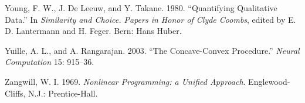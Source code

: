 \documentclass[
  12pt,
  letterpaper,
  DIV=11,
  numbers=noendperiod]{scrartcl}
\newlength{\cslhangindent}
\newenvironment{CSLReferences}[2] %
 {\begin{list}{}{%
  \setlength{\itemindent}{0pt}
  \setlength{\leftmargin}{0pt}
  \setlength{\parsep}{0pt}
  \ifodd #1
   \setlength{\leftmargin}{\cslhangindent}
   \setlength{\itemindent}{-1\cslhangindent}
  \fi
  \setlength{\itemsep}{#2\baselineskip}}}
 {\end{list}}
\begin{document}
\begin{CSLReferences}{1}{0}
Young, F. W., J. De Leeuw, and Y. Takane. 1980. {``Quantifying
Qualitative Data.''} In \emph{Similarity and Choice. Papers in Honor of
Clyde Coombs}, edited by E. D. Lantermann and H. Feger. Bern: Hans
Huber.

Yuille, A. L., and A. Rangarajan. 2003. {``{The Concave-Convex
Procedure}.''} \emph{Neural Computation} 15: 915--36.

Zangwill, W. I. 1969. \emph{{Nonlinear Programming: a Unified
Approach}}. Englewood-Cliffs, N.J.: Prentice-Hall.

\end{CSLReferences}
\end{document}
